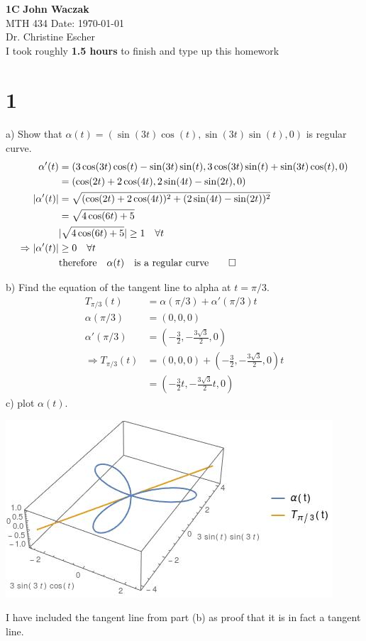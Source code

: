\documentclass[a4paper, 11pt]{article}
\begin{document}
\noindent
\large\textbf{1C} \hfill \textbf{John Waczak} \\
\normalsize MTH 434 \hfill  Date: \today \\
Dr. Christine Escher \\
I took roughly \textbf{1.5 hours} to finish and type up this homework\\ 
\section*{1}
\paragraph{}a) Show that $\alpha(t)=(\sin(3t)\cos(t), \sin(3t)\sin(t), 0)$ is regular curve. 
	\begin{align*}
		\alpha'(t) &= (3\cos(3t)\cos(t)-\sin(3t)\sin(t), 3\cos(3t)\sin(t)+\sin(3t)\cos(t), 0) \\ 
			&= (\cos(2t)+2\cos(4t), 2\sin(4t)-\sin(2t), 0)\\ 
		|\alpha'(t)| &= \sqrt{(\cos(2t)+2\cos(4t))^2+(2\sin(4t)-\sin(2t))^2} \\
			&= \sqrt{4\cos(6t)+5} \\ 
		&|\sqrt{4\cos(6t)+5}| \geq 1 \quad \forall t\\
		\Rightarrow |\alpha'(t)| &\geq 0 \quad \forall t\\
		&\text{therefore}\quad \alpha(t)\quad \text{is a regular curve} \qed
	\end{align*}


b) Find the equation of the tangent line to alpha at $t=\pi/3$. 
	\begin{align*}
		T_{\pi/3}(t) &= \alpha(\pi/3)+\alpha'(\pi/3)t \\ 
		\alpha(\pi/3)&= (0, 0 ,0) \\ 
		\alpha'(\pi/3)&= (-\frac{3}{2}, -\frac{3\sqrt{3}}{2}, 0)\\ 
		\Rightarrow T_{\pi/3}(t) &= (0,0,0)+(-\frac{3}{2}, -\frac{3\sqrt{3}}{2}, 0)t\\
		&=(-\frac{3}{2}t, -\frac{3\sqrt{3}}{2}t, 0)
	\end{align*}
c) plot $\alpha(t)$.
	\begin{center}
		\includegraphics[scale=.75]{1c}
	\end{center}
	I have included the tangent line from part (b) as proof that it is in fact a tangent line. 
	
\end{document}
